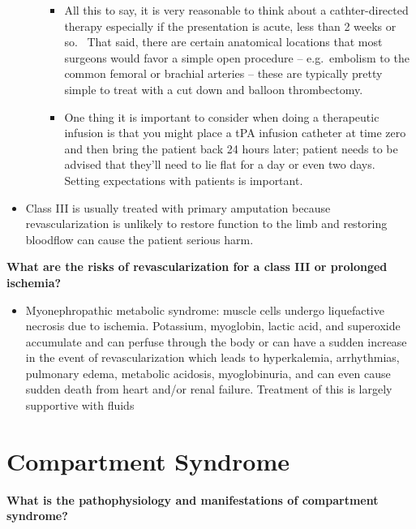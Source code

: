 \documentclass[
]{book}
\providecommand{\tightlist}{%
  \setlength{\itemsep}{0pt}\setlength{\parskip}{0pt}}
\begin{document}
\begin{itemize}
\begin{itemize}
    \begin{itemize}
    \item
      All this to say, it is very reasonable to think about a
      cathter-directed therapy especially if the presentation is
      acute, less than 2 weeks or so.~ That said, there are
      certain anatomical locations that most surgeons would favor
      a simple open procedure -- e.g.~embolism to the common
      femoral or brachial arteries -- these are typically pretty
      simple to treat with a cut down and balloon thrombectomy.~~
    \item
      One thing it is important to consider when doing a
      therapeutic infusion is that you might place a tPA infusion
      catheter at time zero and then bring the patient back 24
      hours later; patient needs to be advised that they'll need
      to lie flat for a day or even two days.~ Setting
      expectations with patients is important.
    \end{itemize}
  \end{itemize}
\item
  Class III is usually treated with primary amputation because
  revascularization is unlikely to restore function to the limb and
  restoring bloodflow can cause the patient serious harm.~
\end{itemize}

\textbf{What are the risks of revascularization for a class III or prolonged
ischemia?}

\begin{itemize}
\tightlist
\item
  Myonephropathic metabolic syndrome: muscle cells undergo
  liquefactive necrosis due to ischemia. Potassium, myoglobin, lactic
  acid, and superoxide accumulate and can perfuse through the body or
  can have a sudden increase in the event of revascularization which
  leads to hyperkalemia, arrhythmias, pulmonary edema, metabolic
  acidosis, myoglobinuria, and can even cause sudden death from heart
  and/or renal failure. \citep{obaraAcuteLimbIschemia2018} Treatment of
  this is largely supportive with fluids
\end{itemize}

\hypertarget{compartment-syndrome}{%
\section{Compartment Syndrome}\label{compartment-syndrome}}

\textbf{What is the pathophysiology and manifestations of compartment
syndrome?}
\end{document}
